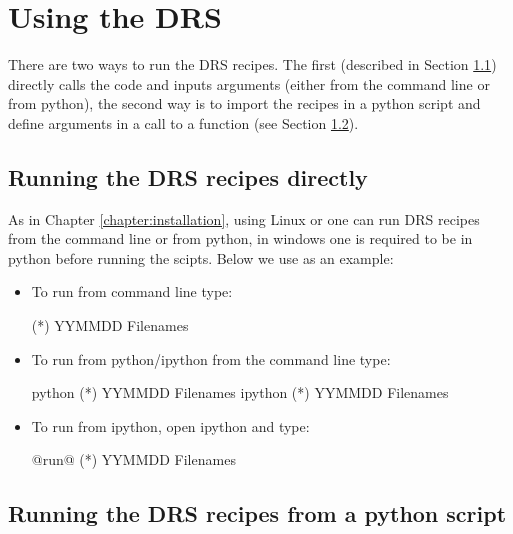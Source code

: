 \chapter{Using the DRS}
\label{chapter:using_the_drs}

There are two ways to run the DRS recipes. The first (described in Section \ref{chapter:using_the_drs:direct}) directly calls the code and inputs arguments (either from the command line or from python), the second way is to import the recipes in a python script and define arguments in a call to a function (see Section \ref{chapter:using_the_drs:script}).

\section{Running the DRS recipes directly}
\label{chapter:using_the_drs:direct}

As in Chapter \ref{chapter:installation}, using Linux or \mac one can run DRS recipes from the command line or from python, in windows one is required to be in python before running the scipts. Below we use \calDARK as an example:
\begin{itemize}
\item To run from command line type:
\begin{cmdbox}
(*\calDARK*) YYMMDD Filenames
\end{cmdbox}

\item To run from python/ipython from the command line type:
\begin{cmdbox}
python (*\calDARK*) YYMMDD Filenames
ipython (*\calDARK*) YYMMDD Filenames
\end{cmdbox}

\item To run from ipython, open ipython and type:
\begin{pythonbox}
@run@ (*\calDARK*) YYMMDD Filenames
\end{pythonbox}
\end{itemize}

\section{Running the DRS recipes from a python script}
\label{chapter:using_the_drs:script}

